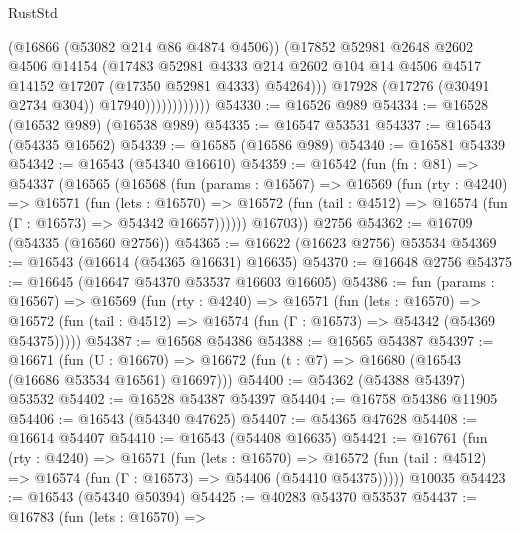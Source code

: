\begin{lexlean}{RustStd}
\begin{coremodule}
                              (@16866 (@53082 @214 @86 @4874 @4506))
                              (@17852
                                @52981
                                @2648
                                @2602
                                @4506
                                @14154
                                (@17483
                                  @52981
                                  @4333
                                  @214
                                  @2602
                                  @104
                                  @14
                                  @4506
                                  @4517
                                  @14152
                                  @17207
                                  (@17350 @52981 @4333)
                                  @54264)))
                            @17928
                            (@17276 (@30491 @2734 @304))
                            @17940))))))))))))
@54330 := @16526 @989
@54334 := @16528 (@16532 @989) (@16538 @989)
@54335 := @16547 @53531
@54337 := @16543 (@54335 @16562)
@54339 := @16585 (@16586 @989)
@54340 := @16581 @54339
@54342 := @16543 (@54340 @16610)
@54359 := @16542
    (fun (fn : @81) =>
    @54337
      (@16565
        (@16568
          (fun (params : @16567) =>
          @16569
            (fun (rty : @4240) =>
            @16571
              (fun (lets : @16570) =>
              @16572 (fun (tail : @4512) => @16574 (fun (Γ : @16573) => @54342 @16657))))))
        @16703))
    @2756
@54362 := @16709 (@54335 (@16560 @2756))
@54365 := @16622 (@16623 @2756) @53534
@54369 := @16543 (@16614 (@54365 @16631) @16635)
@54370 := @16648 @2756
@54375 := @16645 (@16647 @54370 @53537 @16603 @16605)
@54386 := fun (params : @16567) =>
  @16569
    (fun (rty : @4240) =>
    @16571
      (fun (lets : @16570) =>
      @16572 (fun (tail : @4512) => @16574 (fun (Γ : @16573) => @54342 (@54369 @54375)))))
@54387 := @16568 @54386
@54388 := @16565 @54387
@54397 := @16671
    (fun (U : @16670) => @16672 (fun (t : @7) => @16680 (@16543 (@16686 @53534 @16561) @16697)))
@54400 := @54362 (@54388 @54397) @53532
@54402 := @16528 @54387 @54397
@54404 := @16758 @54386 @11905
@54406 := @16543 (@54340 @47625)
@54407 := @54365 @47628
@54408 := @16614 @54407
@54410 := @16543 (@54408 @16635)
@54421 := @16761
    (fun (rty : @4240) =>
    @16571
      (fun (lets : @16570) =>
      @16572 (fun (tail : @4512) => @16574 (fun (Γ : @16573) => @54406 (@54410 @54375)))))
    @10035
@54423 := @16543 (@54340 @50394)
@54425 := @40283 @54370 @53537
@54437 := @16783
    (fun (lets : @16570) =>

\end{coremodule}
\end{lexlean}
